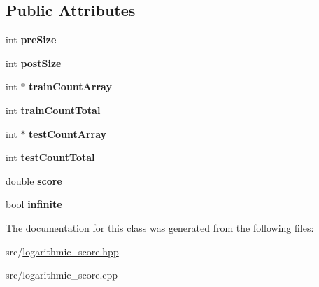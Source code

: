 \subsection*{Public Attributes}
\begin{DoxyCompactItemize}
\item 
\hypertarget{classLogarithmicScoreValue_a553cdae1ae69f229316b73a360589776}{int {\bfseries pre\-Size}}\label{classLogarithmicScoreValue_a553cdae1ae69f229316b73a360589776}

\item 
\hypertarget{classLogarithmicScoreValue_a8b15f92de2d4e003b4a3826c7817b2f8}{int {\bfseries post\-Size}}\label{classLogarithmicScoreValue_a8b15f92de2d4e003b4a3826c7817b2f8}

\item 
\hypertarget{classLogarithmicScoreValue_a7faf693e6b53450f8bdf3d9b8c2bda9b}{int $\ast$ {\bfseries train\-Count\-Array}}\label{classLogarithmicScoreValue_a7faf693e6b53450f8bdf3d9b8c2bda9b}

\item 
\hypertarget{classLogarithmicScoreValue_a5bee04d8401da678ac83f77efd0c6e4a}{int {\bfseries train\-Count\-Total}}\label{classLogarithmicScoreValue_a5bee04d8401da678ac83f77efd0c6e4a}

\item 
\hypertarget{classLogarithmicScoreValue_a3cd25470e851035b0b953ab19d3416e6}{int $\ast$ {\bfseries test\-Count\-Array}}\label{classLogarithmicScoreValue_a3cd25470e851035b0b953ab19d3416e6}

\item 
\hypertarget{classLogarithmicScoreValue_a4a6de49414afc11d8505313d385f8552}{int {\bfseries test\-Count\-Total}}\label{classLogarithmicScoreValue_a4a6de49414afc11d8505313d385f8552}

\item 
\hypertarget{classLogarithmicScoreValue_aaeac28c5557929803745879f6a1e65d7}{double {\bfseries score}}\label{classLogarithmicScoreValue_aaeac28c5557929803745879f6a1e65d7}

\item 
\hypertarget{classLogarithmicScoreValue_a1cc8b1248437817c7c8055bd0e8d0161}{bool {\bfseries infinite}}\label{classLogarithmicScoreValue_a1cc8b1248437817c7c8055bd0e8d0161}

\end{DoxyCompactItemize}


The documentation for this class was generated from the following files\-:\begin{DoxyCompactItemize}
\item 
src/\hyperlink{logarithmic__score_8hpp}{logarithmic\-\_\-score.\-hpp}\item 
src/logarithmic\-\_\-score.\-cpp\end{DoxyCompactItemize}
